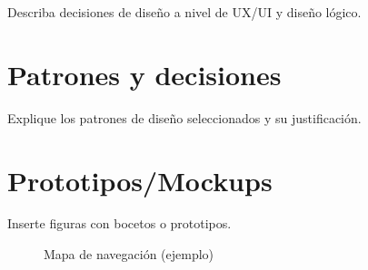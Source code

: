Describa decisiones de diseño a nivel de UX/UI y diseño lógico.
\section*{Patrones y decisiones}
Explique los patrones de diseño seleccionados y su justificación.
\section*{Prototipos/Mockups}
Inserte figuras con bocetos o prototipos.


\begin{figure}[H]
  \centering
  \fbox{\rule{0pt}{120pt}\rule{180pt}{0pt}}
  \caption{Mapa de navegación (ejemplo)}
  \label{fig:mapa-navegacion}
\end{figure}
